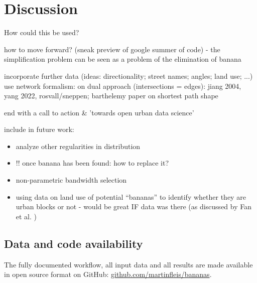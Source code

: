 \section{Discussion}
\label{sec:discussion}

How could this be used?

how to move forward? (sneak preview of google summer of code) - the simplification problem can be seen as a problem of the elimination of banana

incorporate further data (ideas: directionality; street names; angles; land use; ...)
use network formalism: on dual approach (intersections = edges): jiang 2004, yang 2022,
rosvall/sneppen; barthelemy paper on shortest path shape

end with a call to action \& 'towards open urban data science'

\bigskip

include in future work:
\begin{itemize}
    \item analyze other regularities in distribution
    \item !! once banana has been found: how to replace it?
    \item non-parametric bandwidth selection
    \item using data on land use of potential ``bananas'' to identify whether they are urban blocks or not - would be great IF data was there (as discussed by Fan et al.  \cite{fan_polygon-based_2016})
\end{itemize}


\subsection*{Data and code availability}

The fully documented workflow, all input data
and all results are made available in open source format on GitHub:
\href{https://github.com/martinfleis/bananas}{github.com/martinfleis/bananas}.